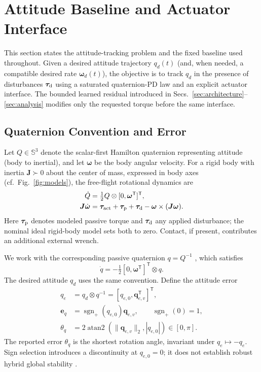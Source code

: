 \documentclass[letterpaper, 10 pt, conference]{ieeeconf}
\newcommand{\T}{^{\mathsf T}}
\newcommand{\sgnp}{\operatorname{sgn}_{+}}
\begin{document}
\section{Attitude Baseline and Actuator Interface}
\label{sec:problem}

This section states the attitude-tracking problem and the fixed baseline used throughout. Given a desired attitude trajectory $q_d(t)$ (and, when needed, a compatible desired rate $\bm\omega_d(t)$), the objective is to track $q_d$ in the presence of disturbances $\bm\tau_{\rm d}$ using a saturated quaternion-PD law and an explicit actuator interface. The bounded learned residual introduced in Secs.~\ref{sec:architecture}--\ref{sec:analysis} modifies only the requested torque before the same interface.

%

\subsection{Quaternion Convention and Error}
Let $Q\in\mathbb S^3$ denote the scalar-first Hamilton quaternion representing attitude (body to inertial), and let $\bm\omega$ be the body angular velocity. For a rigid body with inertia $\bm J\succ0$ about the center of mass, expressed in body axes (cf.~Fig.~\ref{fig:models}), the free-flight rotational dynamics are \cite{schaub2018amss}
\begin{align}
 \dot Q&=\tfrac12 Q\otimes[0,\bm\omega\T]\T,\\
 \bm J\dot{\bm\omega}&=\bm\tau_{\rm act}+\bm\tau_{\rm p}
       +\bm\tau_{\rm d}-\bm\omega\times(\bm J\bm\omega).
 \label{eq:plant}
\end{align}
Here $\bm\tau_{\rm p}$ denotes modeled passive torque and $\bm\tau_{\rm d}$ any applied disturbance; the nominal ideal rigid-body model sets both to zero. Contact, if present, contributes an additional external wrench.

We work with the corresponding passive quaternion $q=Q^{-1}$ \cite{diebel2006quaternion}, which satisfies
\begin{equation}
 \dot q=-\tfrac12[0,\bm\omega\T]\T\otimes q.
 \label{eq:passive}
\end{equation}
The desired attitude $q_d$ uses the same convention. Define the attitude error
\begin{align}
 q_e&=q_d\otimes q^{-1}=[q_{e,0},\bm q_{e,v}\T]\T,\\
 \bm e_q&=\sgnp(q_{e,0})\bm q_{e,v},\qquad \sgnp(0)=1,\\
 \theta_q&=2\operatorname{atan2}(\|\bm q_{e,v}\|_2,|q_{e,0}|)
             \in[0,\pi].
 \label{eq:theta}
\end{align}
The reported error $\theta_q$ is the shortest rotation angle, invariant under $q_e\mapsto-q_e$. Sign selection introduces a discontinuity at $q_{e,0}=0$; it does not establish robust hybrid global stability \cite{mayhew2011hybrid}.
\end{document}
